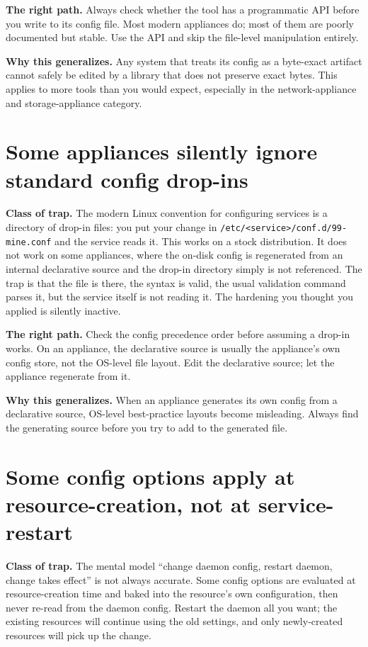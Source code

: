 \documentclass[12pt]{article}
\begin{document}
\textbf{The right path.} Always check whether the tool has a programmatic API before you write to its config file. Most modern appliances do; most of them are poorly documented but stable. Use the API and skip the file-level manipulation entirely.

\textbf{Why this generalizes.} Any system that treats its config as a byte-exact artifact cannot safely be edited by a library that does not preserve exact bytes. This applies to more tools than you would expect, especially in the network-appliance and storage-appliance category.

\section{Some appliances silently ignore standard config drop-ins}

\textbf{Class of trap.} The modern Linux convention for configuring services is a directory of drop-in files: you put your change in \texttt{/etc/<service>/conf.d/99-mine.conf} and the service reads it. This works on a stock distribution. It does not work on some appliances, where the on-disk config is regenerated from an internal declarative source and the drop-in directory simply is not referenced. The trap is that the file is there, the syntax is valid, the usual validation command parses it, but the service itself is not reading it. The hardening you thought you applied is silently inactive.

\textbf{The right path.} Check the config precedence order before assuming a drop-in works. On an appliance, the declarative source is usually the appliance's own config store, not the OS-level file layout. Edit the declarative source; let the appliance regenerate from it.

\textbf{Why this generalizes.} When an appliance generates its own config from a declarative source, OS-level best-practice layouts become misleading. Always find the generating source before you try to add to the generated file.

\section{Some config options apply at resource-creation, not at service-restart}

\textbf{Class of trap.} The mental model ``change daemon config, restart daemon, change takes effect'' is not always accurate. Some config options are evaluated at resource-creation time and baked into the resource's own configuration, then never re-read from the daemon config. Restart the daemon all you want; the existing resources will continue using the old settings, and only newly-created resources will pick up the change.
\end{document}
